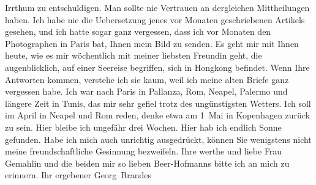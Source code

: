 \begin{ledgroupsized}[t]{13cm}
               Irrthum zu entschuldigen. Man sollte nie Vertrauen an dergleichen Mittheilungen
               haben.\pend
           \pstart
           Ich habe nie die Uebersetzung jenes vor Monaten geschriebenen Artikels gesehen, und ich hatte sogar ganz
               vergessen, dass ich vor Monaten den Photographen in Paris
               bat, Ihnen mein Bild\pwindex{?? [Fotograf in Paris] *~1912@\textsc{?? [Fotograf in Paris]} (*~1912)!Georg Brandes]1913@\strich\emph{[Georg Brandes]} {[}1913{]}|pwv} zu
               senden.\pend
           \pstart
           Es geht mir mit Ihnen heute, wie es mir wöchentlich mit meiner liebsten Freundin geht, die
               augenblicklich, auf einer Seereise begriffen, sich in Hongkong befindet. Wenn Ihre Antworten kommen, verstehe ich sie
               kaum, weil ich meine alten Briefe ganz vergessen habe.\pend
           \pstart
           Ich war nach Paris in Pallanza, Rom, Neapel, Palermo und längere Zeit in Tunis, das
               mir sehr gefiel trotz des ungünstigsten Wetters.\pend
           \pstart
           Ich soll im April in Neapel und Rom reden, denke etwa am 1 Mai in Kopenhagen zurück zu sein. Hier bleibe ich
               ungefähr {\pb}drei Wochen. Hier hab
               ich endlich Sonne gefunden.\pend
           \pstart
           Habe ich mich auch unrichtig ausgedrückt, können Sie wenigstens nicht meine
               freundschaftliche Gesinnung bezweifeln.\pend
           \pstart
           Ihre werthe und liebe Frau Gemahlin und die beiden mir so lieben Beer-Hofmanns bitte ich an mich zu erinnern.\pend
           \pstart Ihr ergebener \spacefill\mbox{Georg Brandes}\pend{}
         
         \endnumbering{}\end{ledgroupsized}  \newcommand{\dateiname}{L02116}\newcommand{\titel}{Georg Brandes an Arthur Schnitzler, 5. 3. 1913}\newcommand{\editorInnen}{Martin Anton Müller und Gerd-Hermann Susen}
      